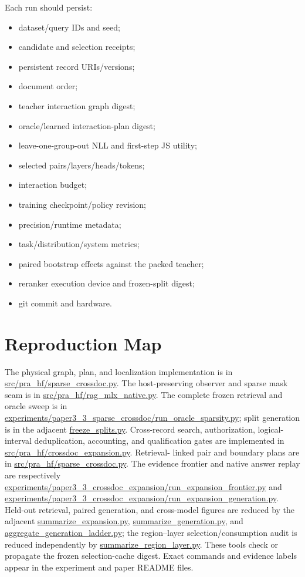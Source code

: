 \documentclass[11pt]{article}
\begin{document}
Each run should persist:
\begin{itemize}[leftmargin=*,nosep]
    \item dataset/query IDs and seed;
    \item candidate and selection receipts;
    \item persistent record URIs/versions;
    \item document order;
    \item teacher interaction graph digest;
    \item oracle/learned interaction-plan digest;
    \item leave-one-group-out NLL and first-step JS utility;
    \item selected pairs/layers/heads/tokens;
    \item interaction budget;
    \item training checkpoint/policy revision;
    \item precision/runtime metadata;
    \item task/distribution/system metrics;
    \item paired bootstrap effects against the packed teacher;
    \item reranker execution device and frozen-split digest;
    \item git commit and hardware.
\end{itemize}

\section{Reproduction Map}

{\small
The physical graph, plan, and localization implementation is in
\url{src/pra_hf/sparse_crossdoc.py}. The host-preserving observer and sparse
mask seam is in \url{src/pra_hf/rag_mlx_native.py}. The complete frozen
retrieval and oracle sweep is in
\url{experiments/paper3_3_sparse_crossdoc/run_oracle_sparsity.py}; split
generation is in the adjacent \url{freeze_splits.py}. Cross-record search,
authorization, logical-interval deduplication, accounting, and qualification
gates are implemented in \url{src/pra_hf/crossdoc_expansion.py}. Retrieval-
linked pair and boundary plans are in \url{src/pra_hf/sparse_crossdoc.py}. The
evidence frontier and native answer replay are respectively
\url{experiments/paper3_3_crossdoc_expansion/run_expansion_frontier.py} and
\url{experiments/paper3_3_crossdoc_expansion/run_expansion_generation.py}.
Held-out retrieval, paired generation, and cross-model figures are reduced by
the adjacent \url{summarize_expansion.py},
\url{summarize_generation.py}, and
\url{aggregate_generation_ladder.py}; the region--layer selection/consumption
audit is reduced independently by \url{summarize_region_layer.py}. These tools
check or propagate the frozen selection-cache digest. Exact commands and
evidence labels appear in the experiment and paper README files.
\par}
\end{document}
